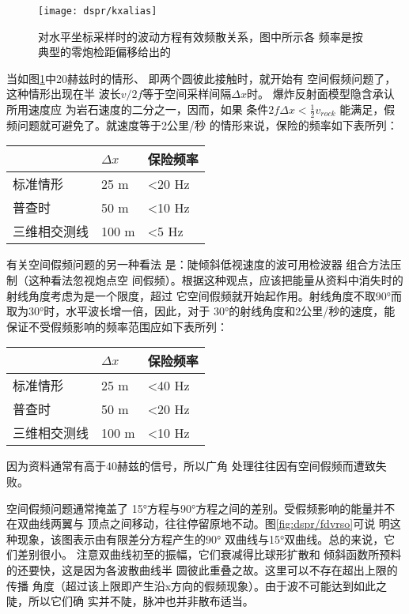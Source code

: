 \begin{figure}[H]
\centering
\texttt{[image: dspr/kxalias]}
\caption[kxalias]{对水平坐标采样时的波动方程有效频散关系，图中所示各
频率是按典型的零炮检距偏移给出的}
\label{fig:dspr/kxalias}
\end{figure}

当如图\ref{fig:dspr/kxalias}中20赫兹时的情形、
即两个圆彼此接触时，就开始有
空间假频问题了，这种情形出现在半
波长$v/2f$等于空间采样间隔$\Delta x$时。
爆炸反射面模型隐含承认所用速度应
为岩石速度的二分之一，因而，如果
条件$2f\Delta x < \frac{1}{2}v_{rock}$
能满足，假频问题就可避免了。就速度等于2公里/秒
的情形来说，保险的频率如下表所列：
\begin{table}[!ht]
\centering
\ttfamily
\small
\begin{tabularx}{\textwidth}{|Y|Y|Y|}
\hline
 & $\Delta x$ & 保险频率\\
\hline
标准情形& 25 m & <20 Hz\\
\hline
普查时& 50 m & <10 Hz\\
\hline
三维相交测线& 100 m & <5 Hz\\
\hline
\end{tabularx}
\end{table}

有关空间假频问题的另一种看法
是：陡倾斜低视速度的波可用检波器 组合方法压制（这种看法忽视炮点空
间假频）。根据这种观点，应该把能量从资料中消失时的射线角度考虑为是一个限度，超过
它空间假频就开始起作用。射线角度不取90°而取为30°时，水平波长增一倍，因此，对于
30°的射线角度和2公里/秒的速度，能保证不受假频影响的频率范围应如下表所列：
\begin{table}[!ht]
\centering
\ttfamily
\small
\begin{tabularx}{\textwidth}{|Y|Y|Y|}
\hline
 & $\Delta x$ & 保险频率\\
\hline
标准情形& 25 m & <40 Hz\\
\hline
普查时& 50 m & <20 Hz\\
\hline
三维相交测线& 100 m & <10 Hz\\
\hline
\end{tabularx}
\end{table}

因为资料通常有高于40赫兹的信号，所以广角
处理往往因有空间假频而遭致失败。

空间假频问题通常掩盖了
15°方程与90°方程之间的差别。受假频影响的能量并不在双曲线两翼与
顶点之间移动，往往停留原地不动。图\ref{fig:dspr/fdvrso}可说
明这种现象，该图表示由有限差分方程产生的90°
双曲线与15°双曲线。总的来说，它们差别很小。
注意双曲线初至的振幅，它们衰减得比球形扩散和
倾斜函数所预料的还要快，这是因为各波散曲线半
圆彼此重叠之故。这里可以不存在超出上限的传播
角度（超过该上限即产生沿x方向的假频现象）。由于波不可能达到如此之陡，所以它们确
实并不陡，脉冲也并非散布适当。

